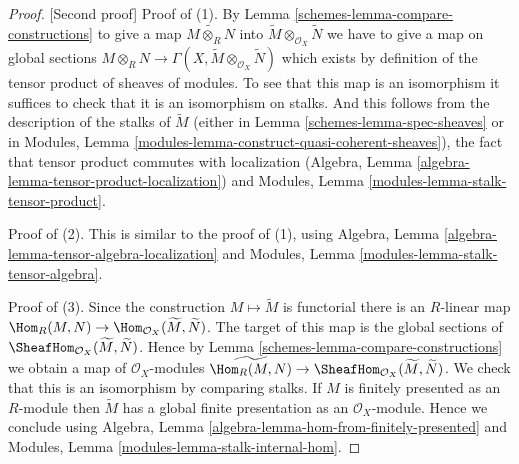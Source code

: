 \begin{proof}
[Second proof]
Proof of (1). By Lemma \ref{schemes-lemma-compare-constructions} to give a map
$\widetilde{M \otimes_R N}$ into
$\widetilde M \otimes_{\mathcal{O}_X} \widetilde N$
we have to give a map on global sections
$M \otimes_R N \to
\Gamma(X, \widetilde M \otimes_{\mathcal{O}_X} \widetilde N)$
which exists by definition of the tensor product of sheaves
of modules. To see that this map is an isomorphism it
suffices to check that it is an isomorphism on stalks.
And this follows from the description of the stalks
of $\widetilde{M}$ (either in Lemma \ref{schemes-lemma-spec-sheaves} or in
Modules, Lemma \ref{modules-lemma-construct-quasi-coherent-sheaves}),
the fact that tensor product commutes with localization
(Algebra, Lemma \ref{algebra-lemma-tensor-product-localization}) and
Modules, Lemma \ref{modules-lemma-stalk-tensor-product}.

\medskip\noindent
Proof of (2). This is similar to the proof of (1), using
Algebra, Lemma \ref{algebra-lemma-tensor-algebra-localization} and
Modules, Lemma \ref{modules-lemma-stalk-tensor-algebra}.

\medskip\noindent
Proof of (3). Since the construction $M \mapsto \widetilde{M}$ is functorial
there is an $R$-linear map
$\Hom_R(M, N) \to \Hom_{\mathcal{O}_X}(\widetilde{M}, \widetilde{N})$.
The target of this map is the global sections of
$\SheafHom_{\mathcal{O}_X}(\widetilde M, \widetilde N)$.
Hence by Lemma \ref{schemes-lemma-compare-constructions} we obtain a map
of $\mathcal{O}_X$-modules $\widetilde{\Hom_R(M,  N)} \to
\SheafHom_{\mathcal{O}_X}(\widetilde M, \widetilde N)$.
We check that this is an isomorphism by comparing stalks.
If $M$ is finitely presented as an $R$-module
then $\widetilde M$ has a global finite presentation as an
$\mathcal{O}_X$-module. Hence we conclude using
Algebra, Lemma \ref{algebra-lemma-hom-from-finitely-presented} and
Modules, Lemma \ref{modules-lemma-stalk-internal-hom}.
\end{proof}

